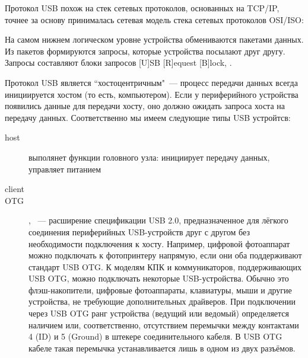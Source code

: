 
Протокол USB похож на стек сетевых протоколов, основанных на TCP/IP, точнее за
основу принималась сетевая модель стека сетевых протоколов OSI/ISO:



На самом нижнем логическом уровне устройства обмениваются пакетами данных. Из пакетов
формируются запросы, которые устройства посылают друг другу. Запросы составляют
блоки запросов [U]SB [R]equest [B]lock, .

Протокол USB является ``хостоцентричным"\ --- процесс передачи данных всегда
инициируется хостом (то есть, компьютером). Если у периферийного устройства
появились данные для передачи хосту, оно должно ожидать запроса хоста на
передачу данных. Соответственно мы имеем следующие типы USB устройтсв:

\begin{description}
  \item[host]  выполянет функции
  головного узла: инициирует передачу данных, управляет питанием
  \item[client] 
  \item[OTG] , \
  --- расширение спецификации USB 2.0, предназначенное для лёгкого соединения
  периферийных USB-устройств друг с другом без необходимости подключения к
  хосту. Например, цифровой фотоаппарат можно подключать к фотопринтеру
  напрямую, если они оба поддерживают стандарт USB OTG. К моделям КПК и
  коммуникаторов, поддерживающих USB OTG, можно подключать некоторые
  USB-устройства. Обычно это флэш-накопители, цифровые фотоаппараты, клавиатуры,
  мыши и другие устройства, не требующие дополнительных драйверов.
  При подключении через USB OTG ранг устройства (ведущий или ведомый)
  определяется наличием или, соответственно, отсутствием перемычки между
  контактами 4 (ID) и 5 (Ground) в штекере соединительного кабеля. В USB OTG
  кабеле такая перемычка устанавливается лишь в одном из двух разъёмов.
\end{description}
